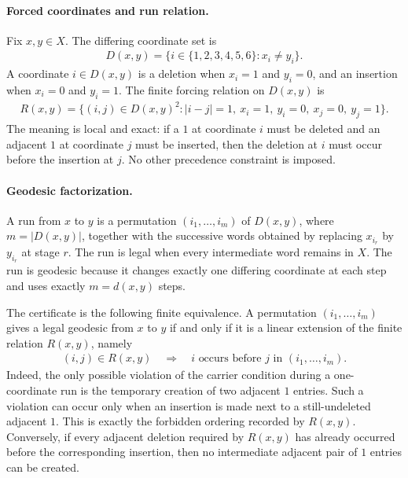 \paragraph{Forced coordinates and run relation.}
Fix $x,y\in X$. The differing coordinate set is
$$
\begin{aligned}
D(x,y)=\{i\in\{1,2,3,4,5,6\}:x_i\ne y_i\}.
\end{aligned}
$$
A coordinate $i\in D(x,y)$ is a deletion when $x_i=1$ and $y_i=0$, and an insertion when $x_i=0$ and $y_i=1$. The finite forcing relation on $D(x,y)$ is
$$
\begin{aligned}
R(x,y)=\{(i,j)\in D(x,y)^2: |i-j|=1,\ x_i=1,\ y_i=0,\ x_j=0,\ y_j=1\}.
\end{aligned}
$$
The meaning is local and exact: if a $1$ at coordinate $i$ must be deleted and an adjacent $1$ at coordinate $j$ must be inserted, then the deletion at $i$ must occur before the insertion at $j$. No other precedence constraint is imposed.

\paragraph{Geodesic factorization.}
A run from $x$ to $y$ is a permutation $(i_1,\ldots,i_m)$ of $D(x,y)$, where $m=|D(x,y)|$, together with the successive words obtained by replacing $x_{i_r}$ by $y_{i_r}$ at stage $r$. The run is legal when every intermediate word remains in $X$. The run is geodesic because it changes exactly one differing coordinate at each step and uses exactly $m=d(x,y)$ steps.

The certificate is the following finite equivalence. A permutation $(i_1,\ldots,i_m)$ gives a legal geodesic from $x$ to $y$ if and only if it is a linear extension of the finite relation $R(x,y)$, namely
$$
\begin{aligned}
(i,j)\in R(x,y)\quad\Longrightarrow\quad i\text{ occurs before }j\text{ in }(i_1,\ldots,i_m).
\end{aligned}
$$
Indeed, the only possible violation of the carrier condition during a one-coordinate run is the temporary creation of two adjacent $1$ entries. Such a violation can occur only when an insertion is made next to a still-undeleted adjacent $1$. This is exactly the forbidden ordering recorded by $R(x,y)$. Conversely, if every adjacent deletion required by $R(x,y)$ has already occurred before the corresponding insertion, then no intermediate adjacent pair of $1$ entries can be created.

